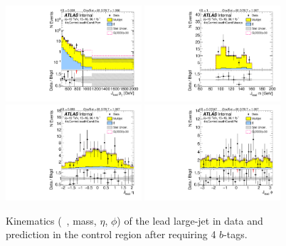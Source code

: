 \begin{figure}[htbp!]
\begin{center}
\includegraphics[width=0.45\textwidth,angle=-90]{figures/boosted/Control/b77_FourTag_Control_leadHCand_Pt_m_1.pdf}
\includegraphics[width=0.45\textwidth,angle=-90]{figures/boosted/Control/b77_FourTag_Control_leadHCand_Mass_s.pdf}\\
\includegraphics[width=0.45\textwidth,angle=-90]{figures/boosted/Control/b77_FourTag_Control_leadHCand_Eta.pdf}
\includegraphics[width=0.45\textwidth,angle=-90]{figures/boosted/Control/b77_FourTag_Control_leadHCand_Phi.pdf}
  \caption{Kinematics (\pt~, mass, $\eta$, $\phi$) of the lead large-\R jet in data and prediction in the control region after requiring 4 $b$-tags. }
  \label{fig:boosted-4b-control-ak10-lead}
\end{center}
\end{figure}


